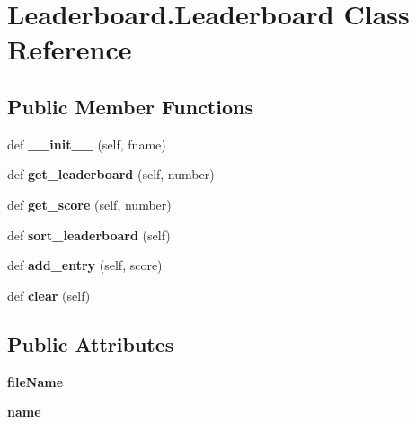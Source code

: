 \hypertarget{class_leaderboard_1_1_leaderboard}{}\section{Leaderboard.\+Leaderboard Class Reference}
\label{class_leaderboard_1_1_leaderboard}
\subsection*{Public Member Functions}
\begin{DoxyCompactItemize}
\item 
\mbox{\label{class_leaderboard_1_1_leaderboard_affaf4d66aef087946bdd8807bf7f5179}} 
def {\bfseries \+\_\+\+\_\+init\+\_\+\+\_\+} (self, fname)
\item 
\mbox{\label{class_leaderboard_1_1_leaderboard_a3e17718a0ee4803bce571e3577fa75de}} 
def {\bfseries get\+\_\+leaderboard} (self, number)
\item 
\mbox{\label{class_leaderboard_1_1_leaderboard_aa1a10cb11235dc6ba207e0cff6586906}} 
def {\bfseries get\+\_\+score} (self, number)
\item 
\mbox{\label{class_leaderboard_1_1_leaderboard_a5d275657e02abc778198a8c4aa6f4304}} 
def {\bfseries sort\+\_\+leaderboard} (self)
\item 
\mbox{\label{class_leaderboard_1_1_leaderboard_a5843c7b6939076a386b2636f85e6596c}} 
def {\bfseries add\+\_\+entry} (self, score)
\item 
\mbox{\label{class_leaderboard_1_1_leaderboard_a0e63ac70057d6e900598b04492b3634c}} 
def {\bfseries clear} (self)
\end{DoxyCompactItemize}
\subsection*{Public Attributes}
\begin{DoxyCompactItemize}
\item 
\mbox{\label{class_leaderboard_1_1_leaderboard_afe984283cfd21ebd9aac63a6a66c2f94}} 
{\bfseries file\+Name}
\item 
\mbox{\label{class_leaderboard_1_1_leaderboard_af4f737f3c0e647c287ecbcf88722d908}} 
{\bfseries name}
\end{DoxyCompactItemize}


